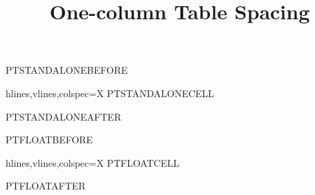\documentclass[onecolumn,nominted]{pt-article}
\title{One-column Table Spacing}
\begin{document}
\noindent PTSTANDALONEBEFORE\par
\begin{tblr}{hlines,vlines,colspec={X}}
    PTSTANDALONECELL
\end{tblr}
\noindent PTSTANDALONEAFTER\par

\clearpage

\noindent PTFLOATBEFORE\par
\begin{table}[H]
    \centering
    \begin{tblr}{hlines,vlines,colspec={X}}
        PTFLOATCELL
    \end{tblr}
    \caption{PTFLOATCAPTION}
\end{table}
\noindent PTFLOATAFTER\par
\end{document}
